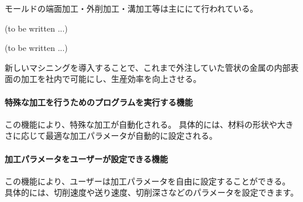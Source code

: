 




モールドの端面加工・外削加工・溝加工等は主に\MMname にて行われている。



(to be written ...)




(to be written ...)



新しいマシニングを導入することで、これまで外注していた管状の金属の内部表面の加工を社内で可能にし、生産効率を向上させる。



\paragraph*{特殊な加工を行うためのプログラムを実行する機能}
この機能により、特殊な加工が自動化される。
具体的には、材料の形状や大きさに応じて最適な加工パラメータが自動的に設定される。

\paragraph*{加工パラメータをユーザーが設定できる機能}
この機能により、ユーザーは加工パラメータを自由に設定することができる。
具体的には、切削速度や送り速度、切削深さなどのパラメータを設定できます。


